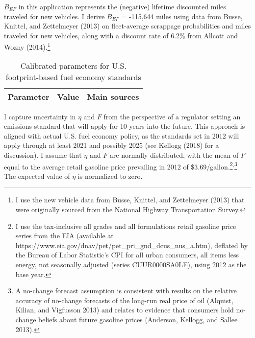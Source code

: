 \documentclass[12pt]{article}
\begin{document}
$B_{EF}$ in this application represents the (negative) lifetime discounted miles traveled for new vehicles. I derive $B_{EF}$ = -115,644 miles using data from Busse, Knittel, and Zettelmeyer (2013) on fleet-average scrappage probabilities and miles traveled for new vehicles, along with a discount rate of 6.2\% from Allcott and Wozny (2014).\footnote{I use the new vehicle data from Busse, Knittel, and Zettelmeyer (2013) that were originally sourced from the National Highway Transportation Survey.}

\begin{table}[!t]
\begin{center}
\caption{Calibrated parameters for U.S. footprint-based fuel economy standards}
\begin{footnotesize}
\begin{tabular}{lll}
Parameter & Value & Main sources \\
\hline

\hline
\end{tabular}
\end{footnotesize}
\label{tab:calfoot}
\end{center}
\end{table}

I capture uncertainty in $\eta$ and $F$ from the perspective of a regulator setting an emissions standard that will apply for 10 years into the future. This approach is aligned with actual U.S. fuel economy policy, as the standards set in 2012 will apply through at least 2021 and possibly 2025 (see Kellogg (2018) for a discussion). I assume that $\eta$ and $F$ are normally distributed, with the mean of $F$ equal to the average retail gasoline price prevailing in 2012 of \$3.69/gallon.\footnote{I use the tax-inclusive all grades and all formulations retail gasoline price series from the EIA (available at https://www.eia.gov/dnav/pet/pet\_pri\_gnd\_dcus\_nus\_a.htm), deflated by the Bureau of Labor Statistic's CPI for all urban consumers, all items less energy, not seasonally adjusted (series CUUR0000SA0LE), using 2012 as the base year.}$^,$\footnote{A no-change forecast assumption is consistent with results on the relative accuracy of no-change forecasts of the long-run real price of oil (Alquist, Kilian, and Vigfusson 2013) and relates to evidence that consumers hold no-change beliefs about future gasoline prices (Anderson, Kellogg, and Sallee 2013).} The expected value of $\eta$ is normalized to zero.
\end{document}
